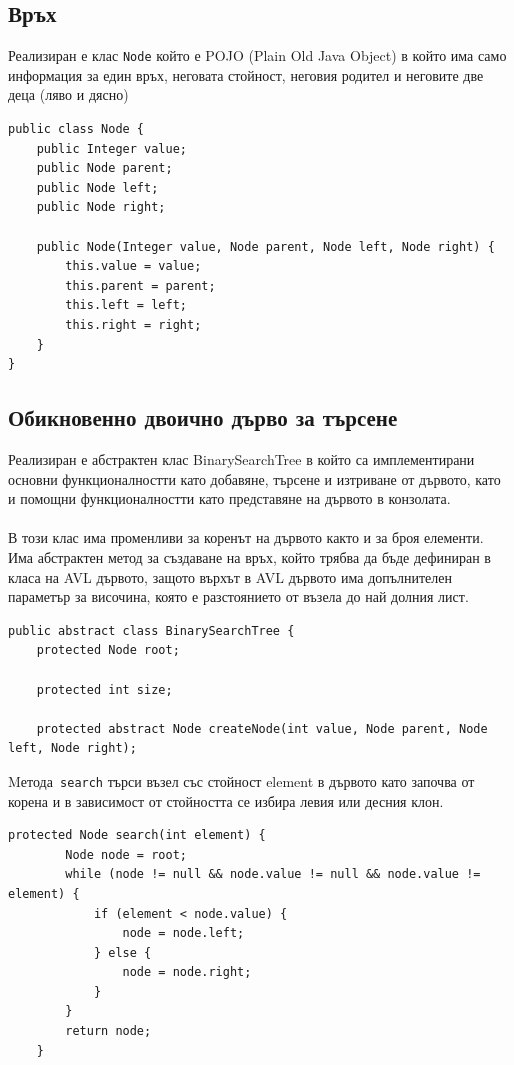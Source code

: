 \documentclass[a4paper,fleqn,12pt]{article}
\begin{document}
\subsection{Връх}
Реализиран е клас \texttt{Node} който е POJO (Plain Old Java Object) в който има само информация за един връх, неговата стойност, неговия родител и неговите две деца (ляво и дясно) 
\begin{lstlisting}
public class Node {
    public Integer value;
    public Node parent;
    public Node left;
    public Node right;

    public Node(Integer value, Node parent, Node left, Node right) {
        this.value = value;
        this.parent = parent;
        this.left = left;
        this.right = right;
    }
}
\end{lstlisting}

\subsection{Обикновенно двоично дърво за търсене}
Реализиран е абстрактен клас BinarySearchTree в който са имплементирани основни функционалностти като добавяне, търсене и изтриване от дървото, като и помощни функционалностти като представяне на дървото в конзолата.  \\
\\
В този клас има променливи за коренът на дървото както и за броя елементи. Има абстрактен метод за създаване на връх, който трябва да бъде дефиниран в класа на AVL дървото, защото върхът в AVL дървото има допълнителен параметър за височина, която е разстоянието от възела до най долния лист.  
\begin{lstlisting}
public abstract class BinarySearchTree {
    protected Node root;

    protected int size;

    protected abstract Node createNode(int value, Node parent, Node left, Node right);
\end{lstlisting}
Mетода\texttt{ search} търси възел със стойност element в дървото като започва от корена и в зависимост от стойността се избира левия или десния клон. 
\begin{lstlisting}
protected Node search(int element) {
        Node node = root;
        while (node != null && node.value != null && node.value != element) {
            if (element < node.value) {
                node = node.left;
            } else {
                node = node.right;
            }
        }
        return node;
    }
\end{lstlisting}
\end{document}
